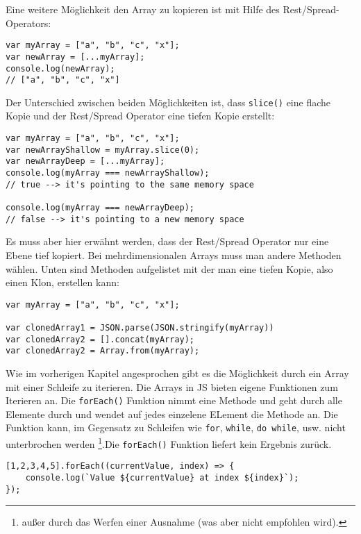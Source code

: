 \documentclass{book}
\begin{document}
Eine weitere Möglichkeit den Array zu kopieren ist mit Hilfe des Rest/Spread-Operators:
\begin{lstlisting}[caption=Array Konstruktor]
var myArray = ["a", "b", "c", "x"];
var newArray = [...myArray];
console.log(newArray);
// ["a", "b", "c", "x"]
\end{lstlisting}

Der Unterschied zwischen beiden Möglichkeiten ist, dass \lstinline|slice()| eine flache Kopie und der Rest/Spread Operator eine tiefen Kopie erstellt:

\begin{lstlisting}[caption=Array Konstruktor]
var myArray = ["a", "b", "c", "x"];
var newArrayShallow = myArray.slice(0);
var newArrayDeep = [...myArray];
console.log(myArray === newArrayShallow);
// true --> it's pointing to the same memory space

console.log(myArray === newArrayDeep);
// false --> it's pointing to a new memory space
\end{lstlisting}

Es muss aber hier erwähnt werden, dass der Rest/Spread Operator nur eine Ebene tief kopiert. Bei mehrdimensionalen Arrays muss man andere Methoden wählen. Unten sind Methoden aufgelistet mit der man eine tiefen Kopie, also einen Klon, erstellen kann:

\begin{lstlisting}[caption=Array Konstruktor]
var myArray = ["a", "b", "c", "x"];

var clonedArray1 = JSON.parse(JSON.stringify(myArray))
var clonedArray2 = [].concat(myArray);
var clonedArray2 = Array.from(myArray);
\end{lstlisting}

Wie im vorherigen Kapitel angesprochen gibt es die Möglichkeit durch ein Array mit einer Schleife zu iterieren. Die Arrays in JS bieten eigene Funktionen zum Iterieren an. Die \lstinline|forEach()| Funktion nimmt eine Methode und geht durch alle Elemente durch und wendet auf jedes einzelene ELement die Methode an. Die Funktion kann, im Gegensatz zu Schleifen wie \lstinline|for|, \lstinline|while|, \lstinline|do while|, usw. nicht unterbrochen werden \footnote{außer durch das Werfen einer Ausnahme (was aber nicht empfohlen wird).}.Die \lstinline|forEach()| Funktion liefert kein Ergebnis zurück.

\begin{lstlisting}[caption=Array Konstruktor]
[1,2,3,4,5].forEach((currentValue, index) => {
	console.log(`Value ${currentValue} at index ${index}`);
});
\end{lstlisting}
\end{document}
